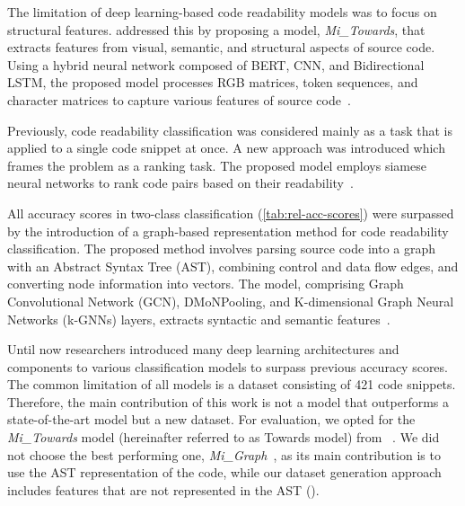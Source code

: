 \documentclass[%
class=scrreprt,
chapterprefix=false,%
open=right,%
twoside=true,%
paper=a4,%
logofile={Logo\_zentral\_farbig\_EN.png},%
thesistype=master,%
UKenglish,%
]{se2thesis}
\theoremstyle{definition}
\newcommand{\numMerged}{421\xspace}
\begin{document}
	The limitation of deep learning-based code readability models was to focus on structural features. \citeauthor{mi2022towards} addressed this by proposing a model, \textit{Mi\_Towards}, that extracts features from visual, semantic, and structural aspects of source code. Using a hybrid neural network composed of BERT, CNN, and Bidirectional LSTM, the proposed model processes RGB matrices, token sequences, and character matrices to capture various features of source code~\cite{mi2022towards}.
	
	Previously, code readability classification was considered mainly as a task that is applied to a single code snippet at once. A new approach was introduced which frames the problem as a ranking task. The proposed model employs siamese neural networks to rank code pairs based on their readability~\cite{mi2022rank}.

	All accuracy scores in two-class classification (\autoref{tab:rel-acc-scores}) were surpassed by the introduction of a graph-based representation method for code readability classification. The proposed method involves parsing source code into a graph with an Abstract Syntax Tree (AST), combining control and data flow edges, and converting node information into vectors. The model, comprising Graph Convolutional Network (GCN), DMoNPooling, and K-dimensional Graph Neural Networks (k-GNNs) layers, extracts syntactic and semantic features~\cite{mi2023graph}.
	

	
	Until now researchers introduced many deep learning architectures and components to various classification models to surpass previous accuracy scores. The common limitation of all models is a dataset consisting of \numMerged code snippets. %
	Therefore, the main contribution of this work is not a model that outperforms a state-of-the-art model but a new dataset. For evaluation, we opted for the \textit{Mi\_Towards} model (hereinafter referred to as Towards model) from \citeauthor{mi2022towards}~\cite{mi2022towards}. We did not choose the best performing one, \textit{Mi\_Graph}~\cite{mi2023graph}, as its main contribution is to use the AST representation of the code, while our dataset generation approach includes features that are not represented in the AST ().
			
\end{document}
